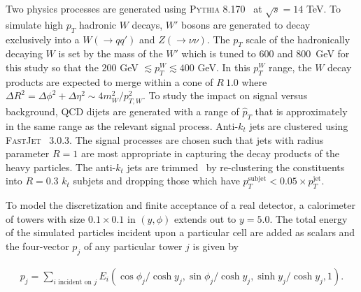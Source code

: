 \documentclass{article}
\begin{document}
Two physics processes are generated using \textsc{Pythia} 8.170~\cite{Pythia8,Pythia} at $\sqrt{s}=14$ TeV.   To simulate high $p_T$ hadronic $W$ decays, $W'$ bosons are generated to decay exclusively into a $W(\rightarrow qq')$ and $Z(\rightarrow\nu\nu)$.  The $p_T$ scale of the hadronically decaying $W$ is set by the mass of the $W'$ which is tuned to 600 and 800~GeV for this study so that the $200$ GeV $\lesssim p_T^W \lesssim 400$ GeV. In this $p_T^W$ range, the $W$ decay products are expected to merge within a cone of $R~1.0$ where $\Delta R^2=\Delta\phi^2+\Delta\eta^2\sim 4m_W^2/p_{T,W}^2$.  To study the impact on signal versus background, QCD dijets are generated with a range of $\hat{p}_T$ that is approximately in the same range as the relevant signal process.  Anti-$k_t$ jets are clustered using \textsc{FastJet}~\cite{fastjet} 3.0.3.  The signal processes are chosen such that jets with radius parameter $R = 1$ are most appropriate in capturing the decay products of the heavy particles.  The anti-$k_t$ jets are trimmed~\cite{trimming} by re-clustering the constituents into $R=0.3$ $k_t$ subjets and dropping those which have $p_T^\text{subjet}<0.05\times p_T^\text{jet}$. 

To model the discretization and finite acceptance of a real detector, a calorimeter of towers with size $0.1\times 0.1$ in $(y,\phi)$ extends out to $y=5.0$.  The total energy of the simulated particles incident upon a particular cell are added as scalars and the four-vector $p_j$ of any particular tower $j$ is given by

\begin{align}
\label{eq:calo}
p_j = \sum_{i\text{ incident on $j$}}E_i(\cos\phi_j/\cosh y_j,\sin\phi_j/\cosh y_j,\sinh y_j/\cosh y_j,1).
\end{align}
\end{document}
